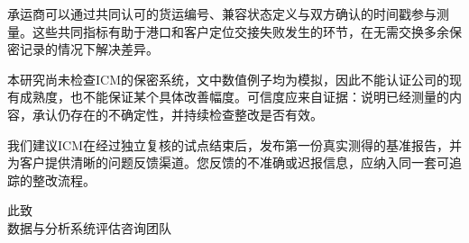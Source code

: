 \begin{minipage}{\linewidth}
{承运商可以通过共同认可的货运编号、兼容状态定义与双方确认的时间戳参与测量。这些共同指标有助于港口和客户定位交接失败发生的环节，在无需交换多余保密记录的情况下解决差异。

本研究尚未检查ICM的保密系统，文中数值例子均为模拟，因此不能认证公司的现有成熟度，也不能保证某个具体改善幅度。可信度应来自证据：说明已经测量的内容，承认仍存在的不确定性，并持续检查整改是否有效。

我们建议ICM在经过独立复核的试点结束后，发布第一份真实测得的基准报告，并为客户提供清晰的问题反馈渠道。您反馈的不准确或迟报信息，应纳入同一套可追踪的整改流程。

\noindent 此致\\数据与分析系统评估咨询团队
}

\ifdefined\ChineseVersion\end{minipage}\par\fi
\clearpage
\renewcommand{\refname}{\bi{References}{参考文献}}
